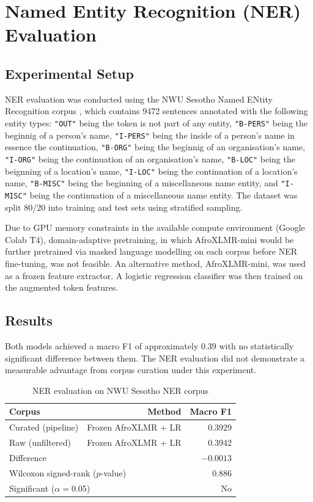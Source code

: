 \documentclass[12pt]{ThesisRU}
\begin{document}
\section{Named Entity Recognition (NER) Evaluation}
\subsection{Experimental Setup}
NER evaluation was conducted using the NWU Sesotho Named ENtity Recognition corpus \citep{eiselen2014developing}, which contains 9472 sentences annotated with the following entity types: \texttt{"OUT"} being the token is not part of any entity, \texttt{"B-PERS"} being the beginnig of a person's name, \texttt{"I-PERS"} being the inside of a person's name in essence the continuation, \texttt{"B-ORG"} being the beginnig of an organisation's name, \texttt{"I-ORG"} being the continuation of an organisation's name, \texttt{"B-LOC"} being the beignning of a location's name, \texttt{"I-LOC"} being the continuation of a location's name, \texttt{"B-MISC"} being the beginning of a miscellaneous name entity, and \texttt{"I-MISC"} being the continuation of a miscellaneous name entity. The dataset was split 80/20 into training and test sets using stratified sampling. 

Due to GPU memory constraints in the available compute environment (Google Colab T4), domain-adaptive pretraining, in which AfroXLMR-mini \citep{alabi-etal-2025-charting} would be further pretrained via masked language modelling on each corpus before NER fine-tuning, was not feasible. An alternative method, AfroXLMR-mini, was used as a frozen feature extractor. A logistic regression classifier was then trained on the augmented token features. 

\subsection{Results}

Both models achieved a macro F1 of approximately 0.39 with no statistically significant difference between them. The NER evaluation did not demonstrate a measurable advantage from corpus curation under this experiment.

\begin{table}[ht]
    \centering
    \begin{tabular}{lrr}
    \toprule
    \textbf{Corpus} & \textbf{Method} & \textbf{Macro F1} \\
    \midrule
    Curated (pipeline) & Frozen AfroXLMR + LR & 0.3929 \\
    Raw (unfiltered)   & Frozen AfroXLMR + LR & 0.3942 \\
    \midrule
    \multicolumn{2}{l}{Difference} & $-0.0013$ \\
    \multicolumn{2}{l}{Wilcoxon signed-rank ($p$-value)} & 0.886 \\
    \multicolumn{2}{l}{Significant ($\alpha = 0.05$)} & No \\
    \bottomrule
    \end{tabular}
    \caption{NER evaluation on NWU Sesotho NER corpus}
    \label{tab:ner_results}
\end{table}
\end{document}
